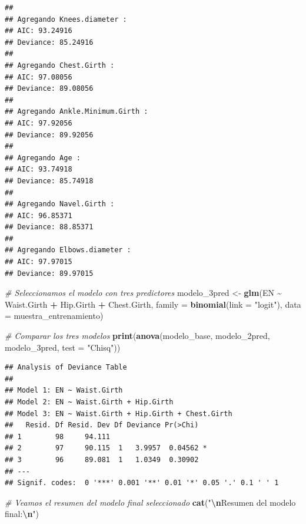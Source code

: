 \documentclass[
]{article}
\newenvironment{Shaded}{\begin{snugshade}}{\end{snugshade}}
\newcommand{\AttributeTok}[1]{\textcolor[rgb]{0.13,0.29,0.53}{#1}}
\newcommand{\CommentTok}[1]{\textcolor[rgb]{0.56,0.35,0.01}{\textit{#1}}}
\newcommand{\FunctionTok}[1]{\textcolor[rgb]{0.13,0.29,0.53}{\textbf{#1}}}
\newcommand{\NormalTok}[1]{#1}
\newcommand{\OtherTok}[1]{\textcolor[rgb]{0.56,0.35,0.01}{#1}}
\newcommand{\SpecialCharTok}[1]{\textcolor[rgb]{0.81,0.36,0.00}{\textbf{#1}}}
\newcommand{\StringTok}[1]{\textcolor[rgb]{0.31,0.60,0.02}{#1}}
\begin{document}
\begin{verbatim}
## 
## Agregando Knees.diameter :
## AIC: 93.24916 
## Deviance: 85.24916 
## 
## Agregando Chest.Girth :
## AIC: 97.08056 
## Deviance: 89.08056 
## 
## Agregando Ankle.Minimum.Girth :
## AIC: 97.92056 
## Deviance: 89.92056 
## 
## Agregando Age :
## AIC: 93.74918 
## Deviance: 85.74918 
## 
## Agregando Navel.Girth :
## AIC: 96.85371 
## Deviance: 88.85371 
## 
## Agregando Elbows.diameter :
## AIC: 97.97015 
## Deviance: 89.97015
\end{verbatim}

\begin{Shaded}
\begin{Highlighting}[]
\CommentTok{\# Seleccionamos el modelo con tres predictores}
\NormalTok{modelo\_3pred }\OtherTok{\textless{}{-}} \FunctionTok{glm}\NormalTok{(EN }\SpecialCharTok{\textasciitilde{}}\NormalTok{ Waist.Girth }\SpecialCharTok{+}\NormalTok{ Hip.Girth }\SpecialCharTok{+}\NormalTok{ Chest.Girth, }
                   \AttributeTok{family =} \FunctionTok{binomial}\NormalTok{(}\AttributeTok{link =} \StringTok{"logit"}\NormalTok{), }
                   \AttributeTok{data =}\NormalTok{ muestra\_entrenamiento)}

\CommentTok{\# Comparar los tres modelos}
\FunctionTok{print}\NormalTok{(}\FunctionTok{anova}\NormalTok{(modelo\_base, modelo\_2pred, modelo\_3pred, }\AttributeTok{test =} \StringTok{"Chisq"}\NormalTok{))}
\end{Highlighting}
\end{Shaded}

\begin{verbatim}
## Analysis of Deviance Table
## 
## Model 1: EN ~ Waist.Girth
## Model 2: EN ~ Waist.Girth + Hip.Girth
## Model 3: EN ~ Waist.Girth + Hip.Girth + Chest.Girth
##   Resid. Df Resid. Dev Df Deviance Pr(>Chi)  
## 1        98     94.111                       
## 2        97     90.115  1   3.9957  0.04562 *
## 3        96     89.081  1   1.0349  0.30902  
## ---
## Signif. codes:  0 '***' 0.001 '**' 0.01 '*' 0.05 '.' 0.1 ' ' 1
\end{verbatim}

\begin{Shaded}
\begin{Highlighting}[]
\CommentTok{\# Veamos el resumen del modelo final seleccionado}
\FunctionTok{cat}\NormalTok{(}\StringTok{"}\SpecialCharTok{\textbackslash{}n}\StringTok{Resumen del modelo final:}\SpecialCharTok{\textbackslash{}n}\StringTok{"}\NormalTok{)}
\end{Highlighting}
\end{Shaded}
\end{document}
